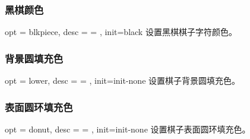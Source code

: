 \documentclass[full]{l3doc}
\begin{document}
\begin{documentation}
\begin{SideBySideExample}[frame=single,numbers=left,
                xrightmargin=.60\linewidth,gobble=2]
  \centering
  \cchessboard[redpiece=white]
\end{SideBySideExample}

\bigskip

\subsubsection{黑棋颜色}

\begin{option}{ opt = blkpiece, desc = {= }, init=black }
  设置黑棋棋子字符颜色。
\end{option}

\begin{SideBySideExample}[frame=single,numbers=left,
                xrightmargin=.60\linewidth,gobble=2]
  \centering
  \cchessboard[blkpiece=white]
\end{SideBySideExample}

\bigskip

\subsubsection{背景圆填充色}

\begin{option}{ opt = lower, desc = {= }, init=init-none }
  设置棋子背景圆填充色。
\end{option}

\begin{SideBySideExample}[frame=single,numbers=left,
                xrightmargin=.60\linewidth,gobble=2]
  \centering
  \cchessboard[lower=black]
\end{SideBySideExample}

\bigskip

\subsubsection{表面圆环填充色}

\begin{option}{ opt = donut, desc = {= }, init=init-none }
  设置棋子表面圆环填充色。
\end{option}


\end{documentation}
\end{document}
